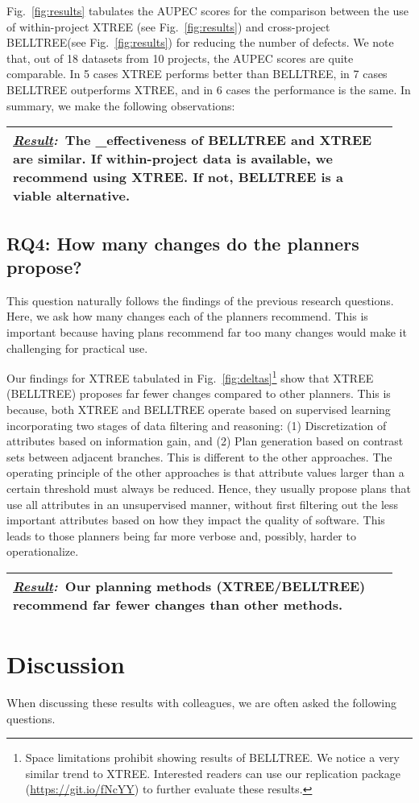 \documentclass[10pt, journal, compsoc]{IEEEtran}
\newcommand{\result}[1]{
\vspace{0.2cm}
\noindent\begin{minipage}{\linewidth}
\begin{tabular}{|p{0.95\linewidth}|}
\hline\vspace{-0.2cm}
\textbf{\textit{\underline{Result}:}}~#1\\\hline
\end{tabular}
\end{minipage}\bigstrut
}
\newcommand{\fig}[1]{Fig.~\ref{fig:#1}}
\begin{document}
\fig{results} tabulates the AUPEC scores for the comparison between the use of within-project XTREE (see \fig{results}\protect{}) and cross-project BELLTREE(see \fig{results}\protect{}) for reducing the number of defects. We note that, out of 18 datasets from 10 projects, the AUPEC scores are quite comparable. In 5 cases XTREE performs better than BELLTREE, in 7 cases BELLTREE outperforms XTREE, and in 6 cases the performance is the same. In summary, we make the following observations:

\result{The _effectiveness of BELLTREE and XTREE are similar. If within-project data is available, we recommend using XTREE. If not, BELLTREE is a viable alternative.}

\subsection*{RQ4: How many changes do the planners propose?}

This question naturally follows the findings of the previous research questions. Here, we ask how many changes each of the planners recommend. This is important because having plans recommend far too many changes would make it challenging for practical use. 

Our findings for XTREE tabulated in \fig{deltas}\footnote{Space limitations prohibit showing results of BELLTREE. We notice a very similar trend to XTREE. Interested readers can use our replication package (\url{https://git.io/fNcYY}) to further evaluate these results.} show that XTREE (BELLTREE) proposes far fewer changes compared to other planners. This is because, both XTREE and BELLTREE operate based on supervised learning incorporating two stages of data filtering and reasoning: (1) Discretization of attributes based on information gain, and (2) Plan generation based on contrast sets between adjacent branches. This is different to the other approaches. The operating principle of the other approaches is that attribute values larger than a certain threshold must always be reduced. Hence, they usually propose plans that use all attributes in an unsupervised manner, without first filtering out the less important attributes based on how they impact the quality of software. This leads to those planners being far more verbose and, possibly, harder to operationalize.


\result{Our planning methods (XTREE/BELLTREE) recommend far fewer changes than other methods.}


\section{Discussion}
\label{sect:discuss}
When discussing these results with colleagues, we are often asked the following questions.
\end{document}
